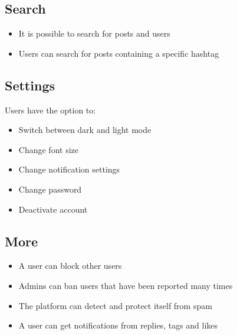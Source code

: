 \documentclass[journal,12pt,onecolumn]{IEEEtran}
\begin{document}
\subsection*{\textbf{Search}}
\begin{itemize}
    \item It is possible to search for posts and users
    \item Users can search for posts containing a specific hashtag
\end{itemize}
%
\subsection*{\textbf{Settings}}
Users have the option to:
\begin{itemize}
    \item Switch between dark and light mode
    \item Change font size
    \item Change notification settings
    \item Change password
    \item Deactivate account
\end{itemize}
%
\subsection*{\textbf{More}}
\begin{itemize}
    \item A user can block other users
    \item Admins can ban users that have been reported many times
    \item The platform can detect and protect itself from spam
    \item A user can get notifications from replies, tags and likes
\end{itemize}    
\end{document}
